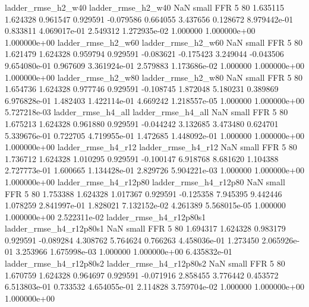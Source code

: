       ladder_rmse_h2_w40       ladder_rmse_h2_w40                   NaN      small      FFR                 5 80 1.635115       1.624328 0.961547       0.929591   -0.079586      0.664055      3.437656     0.128672   8.979442e-01  0.833811 4.069017e-01     2.549312   1.272935e-02            1.000000    1.000000e+00        1.000000e+00
      ladder_rmse_h2_w60       ladder_rmse_h2_w60                   NaN      small      FFR                 5 80 1.621479       1.624328 0.959794       0.929591   -0.083621     -0.175423      3.249044    -0.043506   9.654080e-01  0.967609 3.361924e-01     2.579883   1.173686e-02            1.000000    1.000000e+00        1.000000e+00
      ladder_rmse_h2_w80       ladder_rmse_h2_w80                   NaN      small      FFR                 5 80 1.654736       1.624328 0.977746       0.929591   -0.108745      1.872048      5.180231     0.389869   6.976828e-01  1.482403 1.422114e-01     4.669242   1.218557e-05            1.000000    1.000000e+00        5.727218e-03
      ladder_rmse_h4_all       ladder_rmse_h4_all                   NaN      small      FFR                 5 80 1.675213       1.624328 0.961880       0.929591   -0.044242      3.132685      3.473480     0.624701   5.339676e-01  0.722705 4.719955e-01     1.472685   1.448092e-01            1.000000    1.000000e+00        1.000000e+00
      ladder_rmse_h4_r12       ladder_rmse_h4_r12                   NaN      small      FFR                 5 80 1.736712       1.624328 1.010295       0.929591   -0.100147      6.918768      8.681620     1.104388   2.727773e-01  1.600665 1.134428e-01     2.829726   5.904221e-03            1.000000    1.000000e+00        1.000000e+00
   ladder_rmse_h4_r12p80    ladder_rmse_h4_r12p80                   NaN      small      FFR                 5 80 1.753388       1.624328 1.017367       0.929591   -0.125358      7.945395      9.442446     1.078259   2.841997e-01  1.828021 7.132152e-02     4.261389   5.568015e-05            1.000000    1.000000e+00        2.522311e-02
 ladder_rmse_h4_r12p80s1  ladder_rmse_h4_r12p80s1                   NaN      small      FFR                 5 80 1.694317       1.624328 0.983179       0.929591   -0.089284      4.308762      5.764624     0.766263   4.458036e-01  1.273450 2.065926e-01     3.253966   1.675998e-03            1.000000    1.000000e+00        6.435832e-01
 ladder_rmse_h4_r12p80s2  ladder_rmse_h4_r12p80s2                   NaN      small      FFR                 5 80 1.670759       1.624328 0.964697       0.929591   -0.071916      2.858455      3.776442     0.453572   6.513803e-01  0.733532 4.654055e-01     2.114828   3.759704e-02            1.000000    1.000000e+00        1.000000e+00
